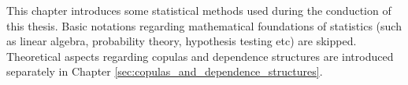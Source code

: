 
This chapter introduces some statistical methods used during the conduction of this thesis. Basic notations regarding mathematical foundations of statistics (such as linear algebra, probability theory, hypothesis testing etc) are skipped. Theoretical aspects regarding copulas and dependence structures are introduced separately in Chapter \ref{sec:copulas_and_dependence_structures}.

